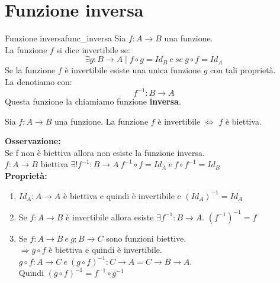 \documentclass[12pt, letterpaper]{report}
\newcounter{theorem}
\newcounter{definition}
\newcommand{\nmu}{}
\begin{document}
	\section{Funzione inversa}
		\begin{definition}{\nmu Funzione inversa}{func_inversa}
			Sia $f: A \to B$ una funzione. \\
			 La funzione $f$ si dice invertibile se:
			 \[\exists g: B \to A \mid f \circ g = Id_{B} \ e \ se \ g \circ f = Id_{A}
			 \]
			Se la funzione $f$ è invertibile esiste una unica funzione $g$ con tali proprietà.
			\\
			La denotiamo con:
			\[
				f^{-1}: B \to A
			\]
			Questa funzione la chiamiamo funzione \textbf{inversa}.
		\end{definition}
		\begin{theorem}{}{}
			Sia $f: A \to B$ una funzione. La funzione $f$ è invertibile $\iff$ $f$ è biettiva.
		\end{theorem}
		\textbf{Osservazione: }
		\\
		Se f non è biettiva allora non esiste la funzione inversa.
		\\
		$f: A \to B$ biettiva $\exists! f^{-1}: B \to A \ f^{-1} \circ f = Id_{A} \ e \ f \circ f^{-1} = Id_{B}$
		\\
		\textbf{Proprietà: }
		\begin{enumerate}
			\item $Id_{A}: A \to A$ è biettiva e quindi è invertibile e $(Id_{A})^{-1} = Id_{A}$
			\item Se $f: A \to B$ è invertibile allora esiste $\exists f^{-1}: B \to A$. $(f^{-1})^{-1} = f$
			\item Se $f: A \to B \ e \ g: B \to C$ sono funzioni biettive. \\ $\Rightarrow g \circ f$ è biettiva e quindi è invertibile. \\ $g \circ f: A \to C \ e \ (g \circ f)^{-1}: C \to A = C \to B \to A$. \\ Quindi $(g \circ f)^{-1} = f^{-1} \circ g^{-1}$
		\end{enumerate}
\end{document}

